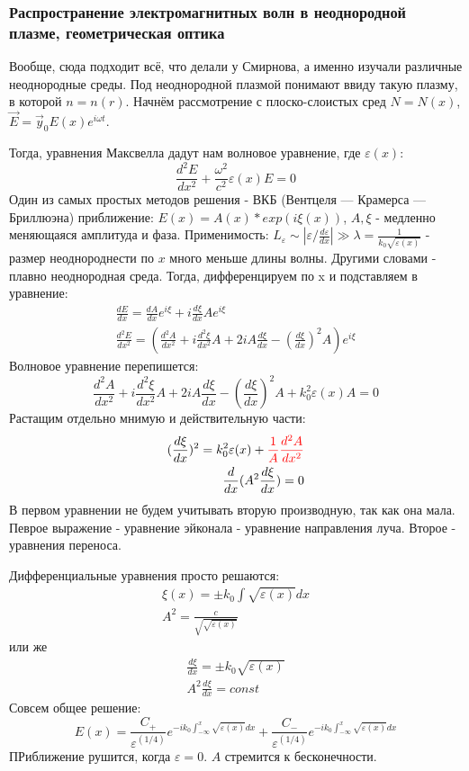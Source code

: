 \documentclass[10pt, a4paper]{article}
\begin{document}
\subsubsection{Распространение электромагнитных волн в неоднородной плазме, геометрическая оптика}
Вообще, сюда подходит всё, что делали у Смирнова, а именно изучали различные неоднородные среды. Под неоднородной плазмой понимают ввиду такую плазму, в которой $n=n(r)$. Начнём рассмотрение с плоско-слоистых сред $N=N(x)$, $\vec E = \vec y_0 E(x) e^{i \omega t}$.

Тогда, уравнения Максвелла дадут нам волновое уравнение, где $\varepsilon(x)$:
\begin{equation}
	\frac{d^2 E}{dx^2} + \frac{\omega^2}{c^2} \varepsilon(x) E=0	
\end{equation}
Один из самых простых методов решения - ВКБ (Вентцеля — Крамерса — Бриллюэна) приближение: $E(x)=A(x)*exp(i \xi(x))$, $A,\xi$ - медленно меняющаяся амплитуда и фаза.
Применимость: $L_{\varepsilon} \sim |\varepsilon / \frac{d \varepsilon}{dx}| \gg \lambda =\frac{1}{k_0 \sqrt{\varepsilon(x)}}$ - размер неоднороднести по $x$ много меньше длины волны. Другими словами - плавно неоднородная среда.
Тогда, дифференцируем по x и подставляем в уравнение:
\begin{align}
	\frac{dE}{dx}=\frac{dA}{dx} e^{i \xi} + i \frac{d \xi}{dx} Ae^{i \xi} \\
	\frac{d^2E}{dx^2}=(\frac{d^2A}{dx^2}+i\frac{d^2 \xi}{dx^2}A+2iA\frac{d \xi}{dx} - (\frac{d \xi}{dx})^2 A )e^{i \xi}
\end{align}
Волновое уравнение перепишется:
\begin{equation}
	\frac{d^2A}{dx^2}+i\frac{d^2 \xi}{dx^2}A+2iA\frac{d \xi}{dx} - (\frac{d \xi}{dx})^2 A + k_0^2 \varepsilon(x) A = 0
\end{equation}
Растащим отдельно мнимую и действительную части:
\begin{align}
	(\frac{d\xi}{dx})^2=k_0^2 \varepsilon(x) + \textcolor{red}{ \frac{1}{A} \frac{d^2A}{dx^2}}\\
	\frac{d}{dx} (A^2 \frac{d\xi}{dx})=0 
\end{align}
В первом уравнении не будем учитывать вторую производную, так как она мала. Певрое выражение - уравнение эйконала - уравнение направления луча. Второе - уравнения переноса.

Дифференциальные уравнения просто решаются:
\begin{align}
	\xi(x)=\pm k_0 \int \sqrt{\varepsilon(x)} dx \\
	A^2=\frac{c}{\sqrt{\sqrt{\varepsilon(x)}}}
\end{align}
или же
\begin{align}
	\frac{d\xi}{dx}=\pm k_0\sqrt{\varepsilon(x)} \\
	A^2 \frac{d \xi}{dx}=const
\end{align}
Совсем общее решение:
\begin{equation}
	E(x)= \frac{C_+}{\varepsilon^{(1/4)}} e^{-ik_0 \int^x_{-\infty} \sqrt{\varepsilon(x)} dx} +\frac{C_-}{\varepsilon^{(1/4)}} e^{-ik_0 \int^x_{-\infty} \sqrt{\varepsilon(x)} dx}
\end{equation}
ПРиближение рушится, когда $\varepsilon=0$. $A$ стремится к бесконечности.
\end{document}
